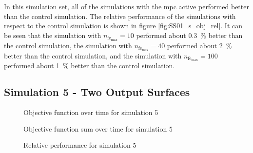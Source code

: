 \documentclass[conference]{IEEEtran}
\begin{document}

In this simulation set, all of the simulations with the \gls{mpc} active performed better than the control simulation.
The relative performance of the simulations with respect to the control simulation is shown in figure \ref{fig:SS01_s_obj_rel}.
It can be seen that the simulation with $n_{\text{fe}_{\text{max}}} = 10$ performed about \SI{0.3}{\percent} better than the control simulation, the simulation with $n_{\text{fe}_{\text{max}}} = 40$ performed about \SI{2}{\percent} better than the control simulation, and the simulation with $n_{\text{fe}_{\text{max}}} = 100$ performed about \SI{1}{\percent} better than the control simulation.


\subsection{Simulation 5 - Two Output Surfaces } \label{subsec:results_SS05}

\begin{figure}[h]
    \centering
    
    \caption{Objective function over time for simulation 5}
    \label{fig:SS05_obj_hist}
\end{figure}

%     

\begin{figure}[h]
    \centering
    
    \caption{Objective function sum over time for simulation 5}
    \label{fig:SS05_s_obj_hist}
\end{figure}

\begin{figure}[h]
    \centering
    
    \caption{Relative performance for simulation 5}
    \label{fig:SS05_s_obj_rel}
\end{figure}
\end{document}

